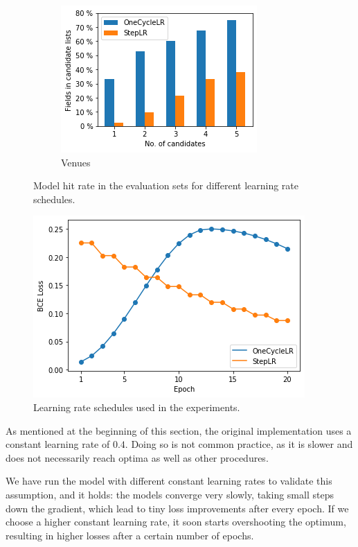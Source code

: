 \begin{figure}
\begin{subfigure}[t]{.32\textwidth}
    \includegraphics[width=\textwidth]{figures/supervised_approach/scheduler_venue.png}
    \caption{Venues}
    \label{fig:scheduler_venue}
  \end{subfigure}
  \caption{Model hit rate in the evaluation sets for different learning rate schedules.}
  \label{fig:scheduler_eval}
\end{figure}

\begin{figure}
    \centering
    \includegraphics[width=.7\textwidth]{figures/supervised_approach/scheduler_lr.png}
    \caption{Learning rate schedules used in the experiments.}
    \label{fig:scheduler_lr}
\end{figure}

As mentioned at the beginning of this section, the original implementation uses a constant learning rate of $0.4$. Doing so is not common practice, as it is slower and does not necessarily reach optima as well as other procedures.

We have run the model with different constant learning rates to validate this assumption, and it holds: the models converge very slowly, taking small steps down the gradient, which lead to tiny loss improvements after every epoch. If we choose a higher constant learning rate, it soon starts overshooting the optimum, resulting in higher losses after a certain number of epochs.

